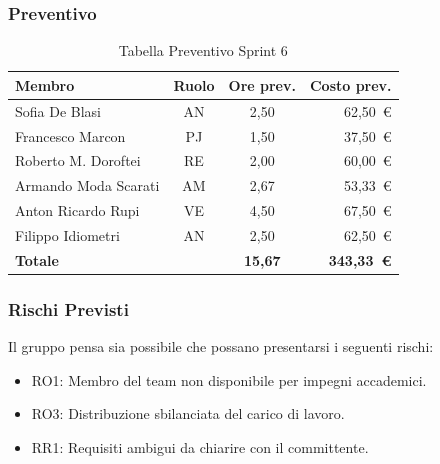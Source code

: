 \subsubsection{Preventivo}
\begin{table}[H]
    \centering
    \renewcommand{\arraystretch}{1.3}
    \begin{tabularx}{\textwidth}{|X|c|c|r|}
        \hline
        \textbf{Membro} & \textbf{Ruolo} & \textbf{Ore prev.} &
        \textbf{Costo prev.} \\
        \hline
        Sofia De Blasi           & AN & 2,50 &  62{,}50~\euro \\
        Francesco Marcon         & PJ & 1,50 &  37{,}50~\euro \\
        Roberto M. Doroftei      & RE & 2,00 &  60{,}00~\euro \\
        Armando Moda Scarati     & AM & 2,67 &  53{,}33~\euro \\
        Anton Ricardo Rupi       & VE & 4,50 &  67{,}50~\euro \\
        Filippo Idiometri        & AN & 2,50 &  62{,}50~\euro \\
        \hline
        \textbf{Totale} & & \textbf{15,67} & \textbf{343{,}33~\euro} \\
        \hline
    \end{tabularx}
    \caption{Tabella Preventivo Sprint 6}
\end{table}

\subsubsection{Rischi Previsti}
Il gruppo pensa sia possibile che possano presentarsi i seguenti rischi:
\begin{itemize}
    \item RO1: Membro del team non disponibile per impegni accademici.
    \item RO3: Distribuzione sbilanciata del carico di lavoro.
    \item RR1: Requisiti ambigui da chiarire con il committente.
\end{itemize}

